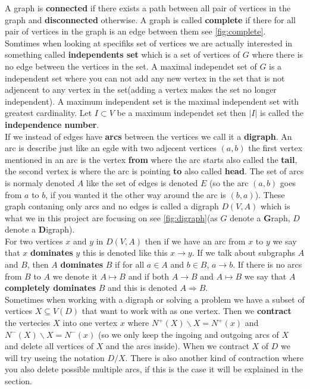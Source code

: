 A graph is \textbf{connected} if there exists a path between all pair of vertices in the graph and \textbf{disconnected} otherwise.
A graph is called \textbf{complete} if there for all pair of vertices in the graph is an edge between them see \autoref{fig:complete}.\\
Somtimes when looking at specifiks set of vertices we are actually interested in something called \textbf{independents set} which is a set of vertices of $G$ where there is no edge between the vertices in the set. A maximal independet set of $G$ is a independent set where you can not add any new vertex in the set that is not adjencent to any vertex in the set(adding a vertex makes the set no longer independent).  
A maximum independent set is the maximal independent set with greatest cardinality. 
Let $I\subset V$ be a maximum independet set then $|I|$ is called the \textbf{independence number}. \\ 

If we instead of edges have \textbf{arcs} between the vertices we call it a \textbf{digraph}.
An arc is describe just like an egde with two adjecent vertices $(a,b)$ the first vertex mentioned in an arc is the vertex \textbf{from} where the arc starts also called the \textbf{tail}, the second vertex is where the arc is pointing \textbf{to} also called \textbf{head}. The set of arcs is normaly denoted $A$ like the set of edges is denoted $E$ 
(so the arc $(a,b)$ goes from $a$ to $b$, if you wanted it the other way around the arc is $(b,a)$).
These graph contaning only arcs and no edges is called a digraph $D(V,A)$ which is what we in this project are focusing on see \autoref{fig:digraph}(as $G$ denote a \textbf{G}raph, $D$ denote a \textbf{D}igraph).\\
For two vertices $x$ and $y$ in $D(V,A)$ then if we have an arc from $x$ to $y$ we say that $x$ \textbf{dominates} $y$ this is denoted like this $x \rightarrow y$. If we talk about subgraphs $A$ and $B$, then $A$ \textbf{dominates} $B$ if for all $a\in A$ and $b\in B$, $a \rightarrow b$. If there is no arcs from $B$ to $A$ we denote it $A\mapsto B$ and if both $A\rightarrow B$ and $A \mapsto B$ we say that $A$ \textbf{completely dominates} $B$ and this is denoted $A\Rightarrow B$.\\ 

Sometimes when working with a digraph or solving a problem we have a subset of vertices $X\subseteq V(D)$ that want to work with as one vertex. 
Then we \textbf{contract} the vertecies $X$ into one vertex $x$ where $N^+(X)\backslash X=N^+(x)$ and $N^-(X)\backslash X=N^-(x)$ (so we only keep the ingoing and outgoing arcs of $X$ and delete all vertices of $X$ and the arcs inside). When we contract $X$ of $D$ we will try useing the notation $D/X$. There is also another kind of contraction where you also delete possible multiple arcs, if this is the case it will be explained in the section.\\

